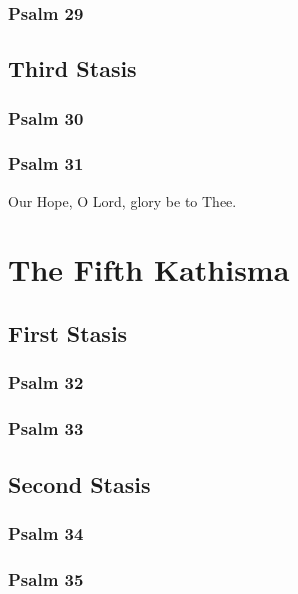 \documentclass[12pt]{book}
\newcommand{\kathismabreak}{
  \medskip
  \begin{center}
  \begin{footnotesize}
  

  

  

  
  \end{footnotesize}
  \end{center}
  \smallbreak
}
\newcommand{\kathismaend}{
  \medskip
  \begin{center}
  \begin{footnotesize}
  

  

  Our Hope, O Lord, glory be to Thee.
  \end{footnotesize}
  \end{center}
  \smallbreak
}
\begin{document}
\subsubsection{Psalm 29}


\kathismabreak

\subsection{Third Stasis}

\subsubsection{Psalm 30}


\subsubsection{Psalm 31}


\kathismaend

\section{The Fifth Kathisma}

\subsection{First Stasis}

\subsubsection{Psalm 32}


\subsubsection{Psalm 33}


\kathismabreak

\subsection{Second Stasis}

\subsubsection{Psalm 34}


\subsubsection{Psalm 35}

\end{document}
